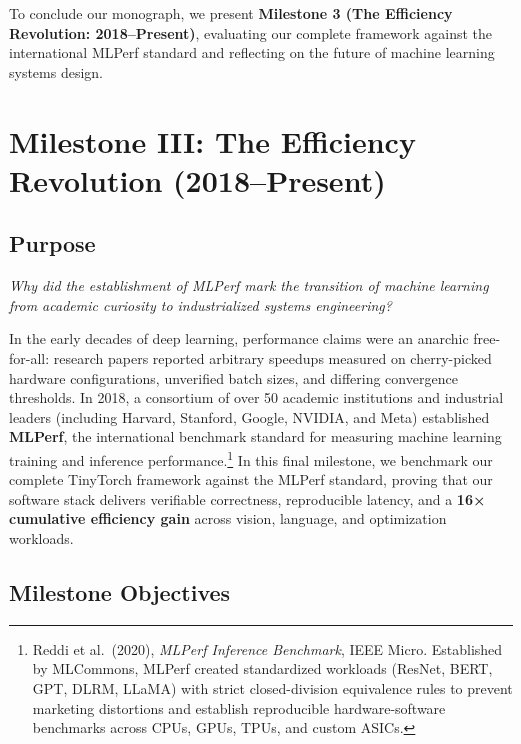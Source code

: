 \documentclass[
  letterpaper,
]{scrbook}
\begin{document}
To conclude our monograph, we present \textbf{Milestone 3 (The
Efficiency Revolution: 2018--Present)}, evaluating our complete
framework against the international MLPerf standard and reflecting on
the future of machine learning systems design.

\chapter*{Milestone III: The Efficiency Revolution
(2018--Present)}\label{milestone-iii-the-efficiency-revolution-2018present}


\section*{Purpose}\label{purpose-23}


\emph{Why did the establishment of MLPerf mark the transition of machine
learning from academic curiosity to industrialized systems engineering?}

In the early decades of deep learning, performance claims were an
anarchic free-for-all: research papers reported arbitrary speedups
measured on cherry-picked hardware configurations, unverified batch
sizes, and differing convergence thresholds. In 2018, a consortium of
over 50 academic institutions and industrial leaders (including Harvard,
Stanford, Google, NVIDIA, and Meta) established \textbf{MLPerf}, the
international benchmark standard for measuring machine learning training
and inference performance.\footnote{Reddi et al.~(2020), \emph{MLPerf
  Inference Benchmark}, IEEE Micro. Established by MLCommons, MLPerf
  created standardized workloads (ResNet, BERT, GPT, DLRM, LLaMA) with
  strict closed-division equivalence rules to prevent marketing
  distortions and establish reproducible hardware-software benchmarks
  across CPUs, GPUs, TPUs, and custom ASICs.} In this final milestone,
we benchmark our complete TinyTorch framework against the MLPerf
standard, proving that our software stack delivers verifiable
correctness, reproducible latency, and a \textbf{16× cumulative
efficiency gain} across vision, language, and optimization workloads.

\section*{Milestone Objectives}\label{milestone-objectives-2}
\end{document}
